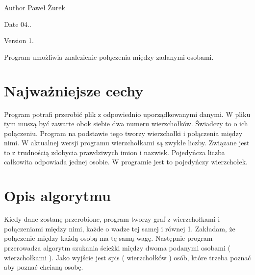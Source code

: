 \begin{DoxyAuthor}{Author}
Paweł Żurek 
\end{DoxyAuthor}
\begin{DoxyDate}{Date}
04.. 
\end{DoxyDate}
\begin{DoxyVersion}{Version}
1.
\end{DoxyVersion}
Program umożliwia znalezienie połączenia między zadanymi osobami.\hypertarget{index_etykieta-wazne-cechy}{}\section{Najważniejsze cechy}\label{index_etykieta-wazne-cechy}
Program potrafi przerobić plik z odpowiednio uporządkowanymi danymi. W pliku tym muszą być zawarte obok siebie dwa numeru wierzchołków. Świadczy to o ich połączeniu. Program na podstawie tego tworzy wierzchołki i połączenia między nimi. W aktualnej wersji programu wierzchołkami są zwykłe liczby. Związane jest to z trudnością zdobycia prawdziwych imion i nazwisk. Pojedyńcza liczba całkowita odpowiada jednej osobie. W programie jest to pojedyńczy wierzchołek.\hypertarget{index_etykieta-op-algorytm}{}\section{Opis algorytmu}\label{index_etykieta-op-algorytm}
Kiedy dane zostanę przerobione, program tworzy graf z wierzchołkami i połączeniami między nimi, każde o wadze tej samej i równej 1. Zakładam, że połączenie między każdą osobą ma tę samą wagę. Następnie program przerowadza algorytm szukania ścieżki między dwoma podanymi osobami ( wierzchołkami ). Jako wyjście jest spis ( wierzchołków ) osób, które trzeba poznać aby poznać chcianą osobę. 